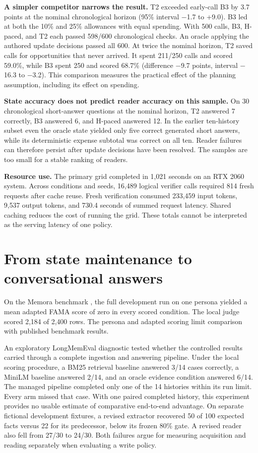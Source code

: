 \documentclass[11pt]{article}
\begin{document}
\textbf{A simpler competitor narrows the result.} T2 exceeded early-call B3 by 3.7 points at the nominal chronological horizon (95\% interval \ensuremath{-}1.7 to +9.0). B3 led at both the 10\% and 25\% allowances with equal spending. With 500 calls, B3, H-paced, and T2 each passed 598/600 chronological checks. An oracle applying the authored update decisions passed all 600. At twice the nominal horizon, T2 saved calls for opportunities that never arrived. It spent 211/250 calls and scored 59.0\%, while B3 spent 250 and scored 68.7\% (difference \ensuremath{-}9.7 points, interval \ensuremath{-}16.3 to \ensuremath{-}3.2). This comparison measures the practical effect of the planning assumption, including its effect on spending.

\textbf{State accuracy does not predict reader accuracy on this sample.} On 30 chronological short-answer questions at the nominal horizon, T2 answered 7 correctly, B3 answered 6, and H-paced answered 12. In the earlier ten-history subset even the oracle state yielded only five correct generated short answers, while its deterministic expense subtotal was correct on all ten. Reader failures can therefore persist after update decisions have been resolved. The samples are too small for a stable ranking of readers.

\textbf{Resource use.} The primary grid completed in 1,021 seconds on an RTX 2060 system. Across conditions and seeds, 16,489 logical verifier calls required 814 fresh requests after cache reuse. Fresh verification consumed 233,459 input tokens, 9,537 output tokens, and 730.4 seconds of summed request latency. Shared caching reduces the cost of running the grid. These totals cannot be interpreted as the serving latency of one policy.

\section{From state maintenance to conversational answers}

On the Memora benchmark \cite{uddin2026memora}, the full development run on one persona yielded a mean adapted FAMA score of zero in every scored condition. The local judge scored 2,184 of 2,400 rows. The persona and adapted scoring limit comparison with published benchmark results.

An exploratory LongMemEval diagnostic tested whether the controlled results carried through a complete ingestion and answering pipeline. Under the local scoring procedure, a BM25 retrieval baseline answered 3/14 cases correctly, a MiniLM baseline answered 2/14, and an oracle evidence condition answered 6/14. The managed pipeline completed only one of the 14 histories within its run limit. Every arm missed that case. With one paired completed history, this experiment provides no usable estimate of comparative end-to-end advantage. On separate fictional development fixtures, a revised extractor recovered 50 of 100 expected facts versus 22 for its predecessor, below its frozen 80\% gate. A revised reader also fell from 27/30 to 24/30. Both failures argue for measuring acquisition and reading separately when evaluating a write policy.
\end{document}
